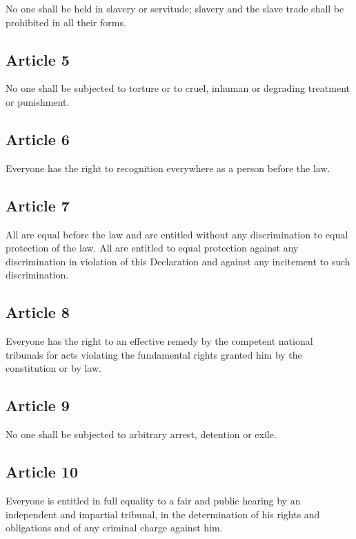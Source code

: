 \documentclass[
  titlepage,
  openright,
  DIV=calc,
  toc=listof,
  listof=nochaptergap]{scrbook}
\begin{document}
No one shall be held in slavery or servitude; slavery and the slave
trade shall be prohibited in all their forms.

\subsection{Article 5}\label{article-5}

No one shall be subjected to torture or to cruel, inhuman or degrading
treatment or punishment.

\subsection{Article 6}\label{article-6}

Everyone has the right to recognition everywhere as a person before the
law.

\subsection{Article 7}\label{article-7}

All are equal before the law and are entitled without any discrimination
to equal protection of the law. All are entitled to equal protection
against any discrimination in violation of this Declaration and against
any incitement to such discrimination.

\subsection{Article 8}\label{article-8}

Everyone has the right to an effective remedy by the competent national
tribunals for acts violating the fundamental rights granted him by the
constitution or by law.

\subsection{Article 9}\label{article-9}

No one shall be subjected to arbitrary arrest, detention or exile.

\subsection{Article 10}\label{article-10}

Everyone is entitled in full equality to a fair and public hearing by an
independent and impartial tribunal, in the determination of his rights
and obligations and of any criminal charge against him.
\end{document}
